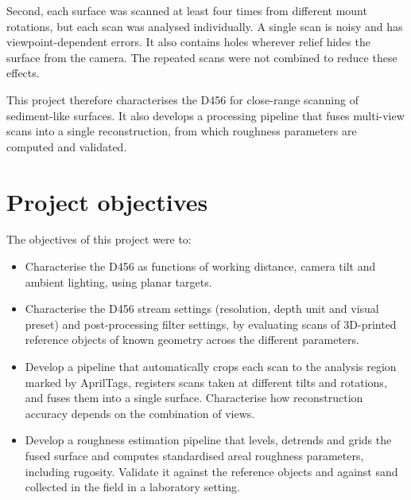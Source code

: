 Second, each surface was scanned at least four times from different mount rotations, but each scan was analysed individually. A single scan is noisy and has viewpoint-dependent errors. It also contains holes wherever relief hides the surface from the camera. The repeated scans were not combined to reduce these effects.


This project therefore characterises the D456 for close-range scanning of sediment-like surfaces. It also develops a processing pipeline that fuses multi-view scans into a single reconstruction, from which roughness parameters are computed and validated.

\section{Project objectives}
\label{sec:ch1.projectobjectives}
The objectives of this project were to:
\begin{itemize}
	\item Characterise the D456 as functions of working distance, camera tilt and ambient lighting, using planar targets.
	
	\item Characterise the D456 stream settings (resolution, depth unit and visual preset) and post-processing filter settings, by evaluating scans of 3D-printed reference objects of known geometry across the different parameters.
	
	\item Develop a pipeline that automatically crops each scan to the analysis region marked by AprilTags, registers scans taken at different tilts and rotations, and fuses them into a single surface. Characterise how reconstruction accuracy depends on the combination of views.
	
	\item Develop a roughness estimation pipeline that levels, detrends and grids the fused surface and computes standardised areal roughness parameters, including rugosity. Validate it against the reference objects and against sand collected in the field in a laboratory setting.
	
\end{itemize}

